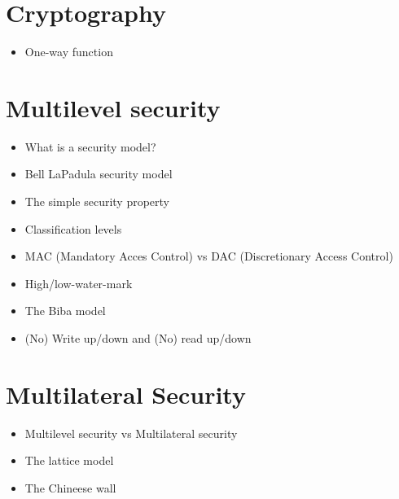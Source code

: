 \section{Cryptography}
	\begin{itemize}
		\item One-way function
	\end{itemize}

\clearpage
\section{Multilevel security}
	\begin{itemize}
		\item What is a security model?
		\item Bell LaPadula security model
		\item The simple security property
		\item Classification levels
		\item MAC (Mandatory Acces Control) vs DAC (Discretionary Access Control)
		\item High/low-water-mark
		\item The Biba model
		\item (No) Write up/down and (No) read up/down
	\end{itemize}

\section{Multilateral Security}
	\begin{itemize}
		\item Multilevel security vs Multilateral security
		\item The lattice model
		\item The Chineese wall
	\end{itemize}
